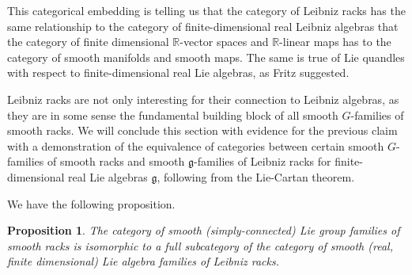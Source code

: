 \documentclass[12pt]{amsart}
\theoremstyle{plain}
\newtheorem{proposition}[theorem]{Proposition}
\theoremstyle{definition}
\begin{document}
\vspace{5mm}

This categorical embedding is telling us that the category of Leibniz racks has the same relationship to the category of finite-dimensional real Leibniz algebras that the category of finite dimensional $\mathbb{R}$-vector spaces and $\mathbb{R}$-linear maps has to the category of smooth manifolds and smooth maps. The same is true of Lie quandles with respect to finite-dimensional real Lie algebras, as Fritz \cite{Fritz} suggested. 

Leibniz racks are not only interesting for their connection to Leibniz algebras, as they are in some sense the fundamental building block of all smooth $G$-families of smooth racks. We will conclude this section with evidence for the previous claim with a demonstration of the equivalence of categories between certain smooth $G$-families of smooth racks and smooth $\mathfrak{g}$-families of Leibniz racks for finite-dimensional real Lie algebras $\mathfrak{g}$, following from the Lie-Cartan theorem. 

\vspace{5mm}
We have the following proposition.

\begin{proposition}
The category of smooth (simply-connected) Lie group families of smooth racks is isomorphic to a full subcategory of the category of smooth (real, finite dimensional) Lie algebra families of Leibniz racks.
\end{proposition}

\end{document}
